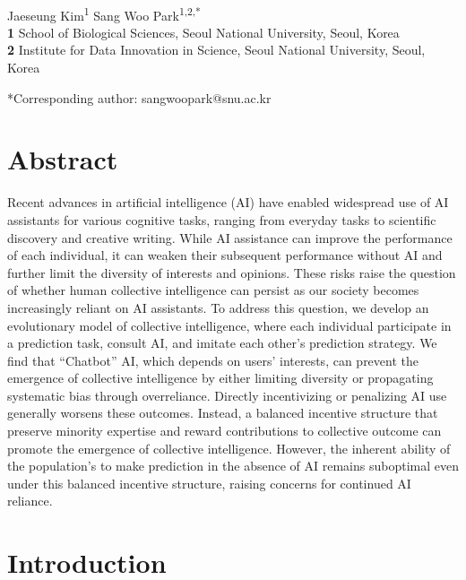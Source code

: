 \documentclass[12pt]{article}
\date{\today}
\begin{document}
\begin{flushleft}{
	\Large
	\textbf{}
}
\newline
\\
Jaeseung Kim\textsuperscript{1} Sang Woo Park\textsuperscript{1,2,*}
\\
\bigskip
\textbf{1} School of Biological Sciences, Seoul National University, Seoul, Korea\\
\textbf{2} Institute for Data Innovation in Science, Seoul National University, Seoul, Korea
\bigskip

*Corresponding author: sangwoopark@snu.ac.kr
\end{flushleft}

\section*{Abstract}

Recent advances in artificial intelligence (AI) have enabled widespread use of AI assistants for various cognitive tasks, ranging from everyday tasks to scientific discovery and creative writing.
While AI assistance can improve the performance of each individual, it can weaken their subsequent performance without AI and further limit the diversity of interests and opinions.
These risks raise the question of whether human collective intelligence can persist as our society becomes increasingly reliant on AI assistants.
To address this question, we develop an evolutionary model of collective intelligence, where each individual participate in a prediction task, consult AI, and imitate each other's prediction strategy.
We find that ``Chatbot'' AI, which depends on users’ interests, can prevent the emergence of collective intelligence by either limiting diversity or propagating systematic bias through overreliance.
Directly incentivizing or penalizing AI use generally worsens these outcomes.
Instead, a balanced incentive structure that preserve minority expertise and reward contributions to collective outcome can promote the emergence of collective intelligence.
However, the inherent ability of the population's to make prediction in the absence of AI remains suboptimal even under this balanced incentive structure, raising concerns for continued AI reliance.

\pagebreak

\section*{Introduction}
\end{document}
